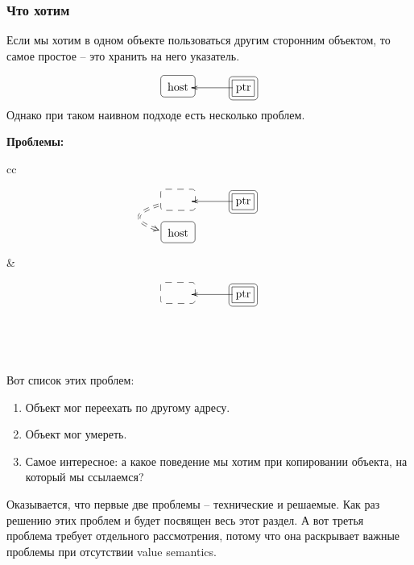 \subsubsection{Что хотим}

Если мы хотим в одном объекте пользоваться другим сторонним объектом, то самое простое -- это хранить на него указатель.

\[
\xymatrix@R=15pt@C=15pt{
  {\text{host}}
  	{
	\save
   [].[]*+[F-:<3pt>]\frm{}
   \restore
	}
  &{}&{\text{ptr}}\ar[ll]
    	{
	\save
   [].[]*[F-]\frm{}
   \restore
	}
    	{
	\save
   [].[]*+[F-:<3pt>]\frm{}
   \restore
	}
  \\ 
}
\]
Однако при таком наивном подходе есть несколько проблем.
\begin{center}
\textbf{Проблемы:}

\vspace{0.5cm}

\begin{tabular}{cc}
{
\begin{minipage}[\baselineskip]{5.5cm}
\[
\xymatrix@R=15pt@C=15pt{
  {\phantom{host}}\ar@{==>}@/_30pt/[d]<-5pt>
  	{
	\save
   [].[]*+[F--:<3pt>]\frm{}
   \restore
	}
  &{}&{\text{ptr}}\ar[ll]
    	{
	\save
   [].[]*[F-]\frm{}
   \restore
	}
    	{
	\save
   [].[]*+[F-:<3pt>]\frm{}
   \restore
	}
  \\ 
  {\text{host}}
    	{
	\save
   [].[]*+[F-:<3pt>]\frm{}
   \restore
	}
  &{}&{}\\
}
\]
\end{minipage}
}&{
\begin{minipage}[\baselineskip]{5.5cm}
\[
\xymatrix@R=15pt@C=15pt{
  {\phantom{host}}
  	{
	\save
   [].[]*+[F--:<3pt>]\frm{}
   \restore
	}
  &{}&{\text{ptr}}\ar[ll]
    	{
	\save
   [].[]*[F-]\frm{}
   \restore
	}
    	{
	\save
   [].[]*+[F-:<3pt>]\frm{}
   \restore
	}
  \\ 
  {\phantom{host}}
  &{}&{}\\
}
\]
\end{minipage}
}\\
\end{tabular}
\end{center}
Вот список этих проблем:
\begin{enumerate}
\item Объект мог переехать по другому адресу.

\item Объект мог умереть.

\item Самое интересное: а какое поведение мы хотим при копировании объекта, на который мы ссылаемся?
\end{enumerate}
Оказывается, что первые две проблемы -- технические и решаемые.
Как раз решению этих проблем и будет посвящен весь этот раздел.
А вот третья проблема требует отдельного рассмотрения, потому что она раскрывает важные проблемы при отсутствии value semantics.

